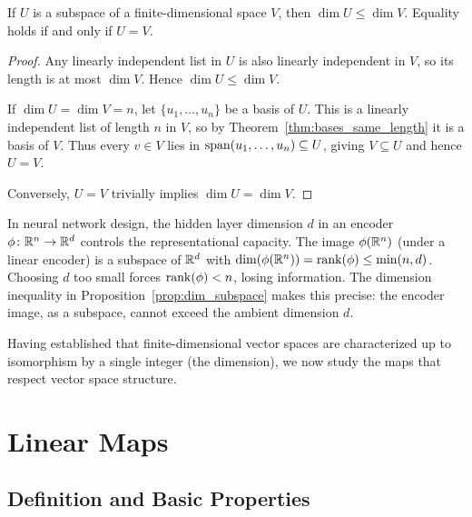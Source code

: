 \documentclass[11pt,a4paper]{article}
\begin{document}
\begin{proposition}
\label{prop:dim_subspace}
If $U$ is a subspace of a finite-dimensional space $V$, then
$\dim U \leq \dim V$.  Equality holds if and only if $U = V$.
\end{proposition}

\begin{proof}
Any linearly independent list in $U$ is also linearly independent in $V$,
so its length is at most $\dim V$.  Hence $\dim U \leq \dim V$.

If $\dim U = \dim V = n$, let $\{u_1, \ldots, u_n\}$ be a basis of $U$.
This is a linearly independent list of length $n$ in $V$, so by
Theorem~\ref{thm:bases_same_length} it is a basis of $V$.  Thus every
$v \in V$ lies in $\operatorname{span}(u_1, \ldots, u_n) \subseteq U$, giving $V \subseteq U$
and hence $U = V$.

Conversely, $U = V$ trivially implies $\dim U = \dim V$.
\end{proof}

\begin{rlconnection}[title={Embedding Dimension and Feature Rank}]
In neural network design, the hidden layer dimension $d$ in an encoder
$\phi\colon \mathbb{R}^n \to \mathbb{R}^d$ controls the representational capacity.
The image $\phi(\mathbb{R}^n)$ (under a linear encoder) is a subspace of $\mathbb{R}^d$ with
$\dim(\phi(\mathbb{R}^n)) = \operatorname{rank}(\phi) \leq \min(n, d)$.  Choosing $d$ too small
forces $\operatorname{rank}(\phi) < n$, losing information.  The dimension inequality
in Proposition~\ref{prop:dim_subspace} makes this precise: the encoder
image, as a subspace, cannot exceed the ambient dimension $d$.
\end{rlconnection}

Having established that finite-dimensional vector spaces are characterized up to
isomorphism by a single integer (the dimension), we now study the maps that
respect vector space structure.

\section{Linear Maps}
\label{sec:linear_maps}

\subsection{Definition and Basic Properties}
\end{document}
